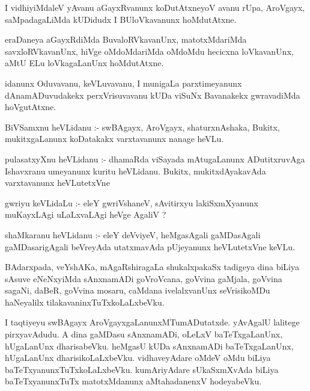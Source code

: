 \documentclass{article}
\begin{document}
\begin{mn}
I  vidhiyiMdaleV  yAvanu  aGayxRvanunx  koDutAtxneyoV  avanu  rUpa,  AroVgayx,  saMpadagaLiMda  
kUDidudx  I  BUloVkavanunx  hoMdutAtxne.
\end{mn}

\begin{mn}
eraDaneya  aGayxRdiMda  BuvaloRVkavanUnx,  matotxMdariMda  savxloRVkavanUnx, hiVge  oMdoMdariMda  
oMdoMdu  hecicxna  loVkavanUnx,  aMtU  ELu  loVkagaLanUnx  hoMdutAtxne.
\end{mn}

\begin{mn}
idanunx  Oduvavanu,  keVLuvavanu,  I  munigaLa  parxtimeyanunx  dAnamADuvudakekx  perxVrisuvavanu  
kUDa  viSuNx  Bavanakekx  gwravadiMda  hoVgutAtxne.
\end{mn}

\begin{mn}
BiVSamxnu  heVLidanu :- swBAgayx,  AroVgayx,  shaturxnAshaka,  Bukitx,  mukitxgaLanunx  koDatakakx  
varxtavanunx  nanage  heVLu.
\end{mn}

\begin{mn}
pulasatxyXnu  heVLidanu :- dhamaRda  viSayada  mAtugaLanunx  ADutitxruvAga  Ishavxranu  umeyanunx  
kuritu  heVLidanu.  Bukitx,  mukitxdAyakavAda  varxtavanunx  heVLutetxVne
\end{mn}

\begin{mn}
gwriyu  keVLidaLu :- eleY  gwriVshaneV,  sAvitirxyu  lakiSxmXyanunx  muKayxLAgi  uLaLxvaLAgi  heVge  AgaliV ?
\end{mn}

\begin{mn}
shaMkaranu  heVLidanu :- eleY  deVviyeV, heMgasAgali  gaMDasAgali  gaMDasarigAgali  beVreyAda  utatxmavAda  
pUjeyanunx  heVLutetxVne  keVLu.
\end{mn}

\begin{mn}
BAdarxpada,  veYshAKa,  mAgaRshiragaLa  shukalxpakaSx  tadigeya  dina  biLiya  sAsuve  eNeNxyiMda  sAnxnamADi  
goVroVcana,  goVvina gaMjala,  goVvina  sagaNi,  daBeR,  goVvina  mosaru,  caMdana  ivelalxvanUnx  seVrisikoMDu  
haNeyalilx  tilakavaninxTuTxkoLaLxbeVku.
\end{mn}

\begin{mn}
I  taqtiyeyu  swBAgayx  AroVgayxgaLanunxMTumADutatxde.  yAvAgalU  lalitege  pirxyavAdudu.  A dina gaMDasu  
sAnxnamADi,  oLeLxV  baTeTxgaLanUnx,  hUgaLanUnx  dharisabeVku.  heMgasU  kUDa  sAnxnamADi  baTeTxgaLanUnx,  
hUgaLanUnx  dharisikoLaLxbeVku.  vidhaveyAdare  oMdeV  oMdu biLiya  baTeTxyanunxTuTxkoLaLxbeVku.  kumAriyAdare  
sUkaSxmXvAda  biLiya  baTeTxyanunxTuTx  matotxMdanunx  aMtahadanenxV  hodeyabeVku.
\end{mn}
\end{document}
